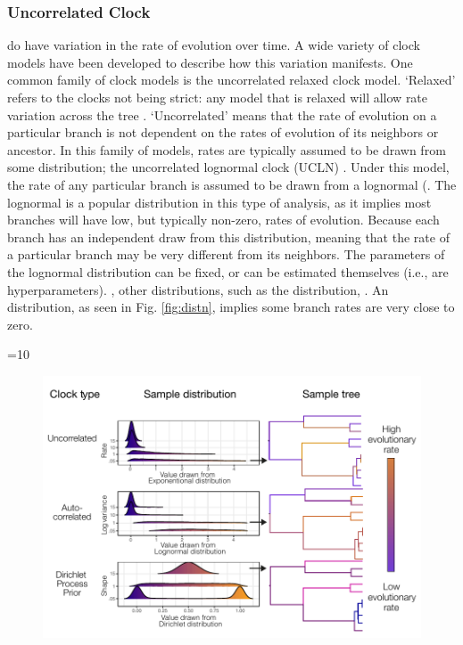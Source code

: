 \subsubsection{Uncorrelated Clock}
 do have variation in the rate of evolution over time.
A wide variety of clock models have been developed to describe how this variation manifests.
One common family of clock models is the uncorrelated relaxed clock model.
`Relaxed' refers to the clocks not being strict: any model that is relaxed will allow rate variation across the tree \citep{Drummond2006, Drummond2007}.
`Uncorrelated' means that the rate of evolution on a particular branch is not dependent on the rates of evolution of its neighbors or ancestor.
In this family of models, rates are typically assumed to be drawn from some distribution;
the uncorrelated lognormal clock (UCLN) .
Under this model, the rate of any particular branch is assumed to be drawn from a lognormal  (.
The lognormal is a popular distribution in this type of analysis, as it implies most branches will have low, but typically non-zero, rates of evolution.
Because each branch has an independent draw from this distribution, meaning that the rate of a particular branch may be very different from its neighbors.
The parameters of the lognormal distribution can be fixed, or can be estimated themselves (i.e., are hyperparameters).
, other distributions, such as the  distribution, .
An  distribution, as seen in Fig. \ref{fig:distn}, implies some branch rates are very close to zero.

\ifnum\value{num}=10{
\begin{figure}
\centering
\includegraphics[width=\textwidth]{Cambridge-Elements/manuscript.R3/submitted_figs/figure4}

\end{figure} }\else{}\fi


